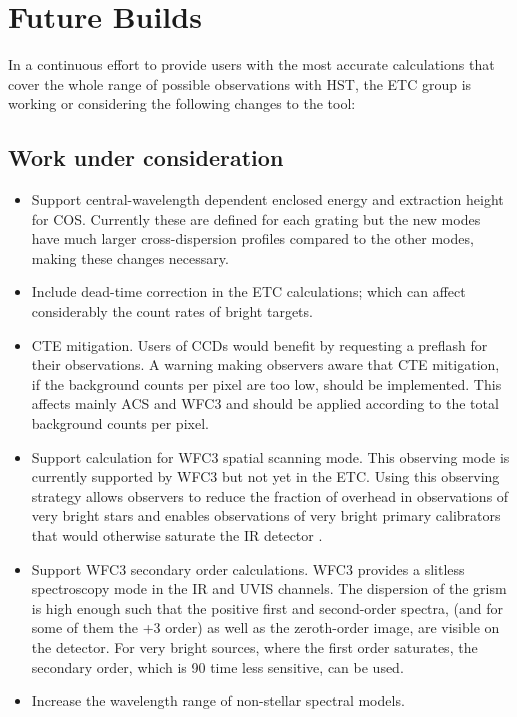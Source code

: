 \section{Future Builds}

In a continuous effort to provide users with the most accurate calculations that cover the whole range of possible observations with HST, the ETC group is working or considering the following changes to the tool:

\subsection{Work under consideration}

\begin{itemize}

\item Support central-wavelength dependent enclosed energy and extraction height for COS. Currently these are  defined for each  grating but the new modes have  much larger cross-dispersion profiles compared to the other modes, making these changes necessary.

\item Include dead-time correction in the ETC calculations; which can affect considerably the count rates of bright targets.

\item CTE mitigation.  Users of CCDs would benefit by requesting a preflash for their observations. A warning making observers aware that CTE mitigation, if the background counts per pixel are too low, should be implemented. This affects mainly ACS and WFC3 and should be applied according to the total background counts per pixel.

\item Support calculation for WFC3 spatial scanning mode. This observing mode is currently supported by WFC3 but not yet in the ETC. Using this observing strategy allows observers to reduce the fraction of overhead in observations of very bright stars and enables observations of very bright primary calibrators that would otherwise saturate the IR detector \citep{TheMcs2011}. 

\item Support WFC3 secondary order calculations. WFC3 provides a slitless spectroscopy mode in the IR and UVIS channels. The dispersion of the grism is high enough such that the positive first and second-order spectra, (and for some of them the +3 order) as well as the zeroth-order image, are visible on the detector. For very bright sources, where the first order saturates, the secondary order, which is 90 time less sensitive, can be used.

\item Increase the wavelength range of non-stellar spectral models.

\end{itemize}

